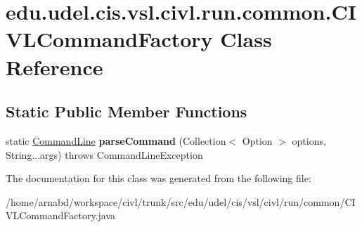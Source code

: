 \hypertarget{classedu_1_1udel_1_1cis_1_1vsl_1_1civl_1_1run_1_1common_1_1CIVLCommandFactory}{}\section{edu.\+udel.\+cis.\+vsl.\+civl.\+run.\+common.\+C\+I\+V\+L\+Command\+Factory Class Reference}
\label{classedu_1_1udel_1_1cis_1_1vsl_1_1civl_1_1run_1_1common_1_1CIVLCommandFactory}
\subsection*{Static Public Member Functions}
\begin{DoxyCompactItemize}
\item 
\hypertarget{classedu_1_1udel_1_1cis_1_1vsl_1_1civl_1_1run_1_1common_1_1CIVLCommandFactory_a18a190d0d4134fbab0beab04944f2a3f}{}static \hyperlink{interfaceedu_1_1udel_1_1cis_1_1vsl_1_1civl_1_1run_1_1IF_1_1CommandLine}{Command\+Line} {\bfseries parse\+Command} (Collection$<$ Option $>$ options, String...\+args)  throws Command\+Line\+Exception \label{classedu_1_1udel_1_1cis_1_1vsl_1_1civl_1_1run_1_1common_1_1CIVLCommandFactory_a18a190d0d4134fbab0beab04944f2a3f}

\end{DoxyCompactItemize}


The documentation for this class was generated from the following file\+:\begin{DoxyCompactItemize}
\item 
/home/arnabd/workspace/civl/trunk/src/edu/udel/cis/vsl/civl/run/common/C\+I\+V\+L\+Command\+Factory.\+java\end{DoxyCompactItemize}
